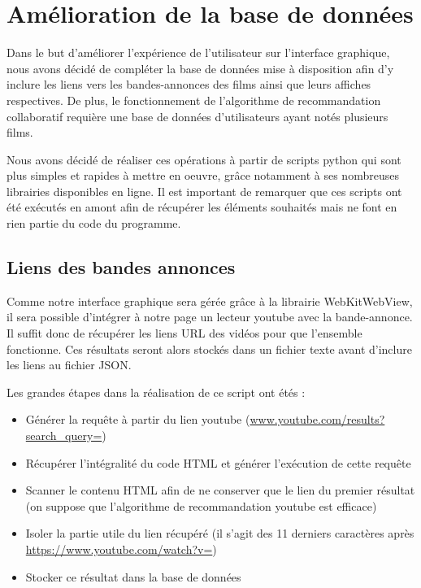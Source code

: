 \section{Amélioration de la base de données}
Dans le but d'améliorer l'expérience de l'utilisateur sur l'interface graphique, nous avons décidé de compléter la base de données mise à disposition afin d'y inclure les liens vers les bandes-annonces des films ainsi que leurs affiches respectives.
De plus, le fonctionnement de l'algorithme de recommandation collaboratif requière une base de données d'utilisateurs ayant notés plusieurs films.
\par Nous avons décidé de réaliser ces opérations à partir de scripts python qui sont plus simples et rapides à mettre en oeuvre, grâce notamment à ses nombreuses librairies disponibles en ligne. Il est important de remarquer que ces scripts ont été exécutés en amont afin de récupérer les éléments souhaités mais ne font en rien partie du code du programme.

\subsection{Liens des bandes annonces}
Comme notre interface graphique sera gérée grâce à la librairie WebKitWebView, il sera possible d'intégrer à notre page un lecteur youtube avec la bande-annonce.
Il suffit donc de récupérer les liens URL des vidéos pour que l'ensemble fonctionne. Ces résultats seront alors stockés dans un fichier texte avant d'inclure les liens au fichier JSON.\par
Les grandes étapes dans la réalisation de ce script ont étés :
\begin{itemize}
	\item Générer la requête à partir du lien youtube (\url{www.youtube.com/results?search\_query=})
	\item Récupérer l'intégralité du code HTML et générer l'exécution de cette requête
	\item Scanner le contenu HTML afin de ne conserver que le lien du premier résultat (on suppose que l'algorithme de recommandation youtube est efficace)
	\item Isoler la partie utile du lien récupéré (il s'agit des 11 derniers caractères après \url{https://www.youtube.com/watch?v=})
	\item Stocker ce résultat dans la base de données
\end{itemize}

